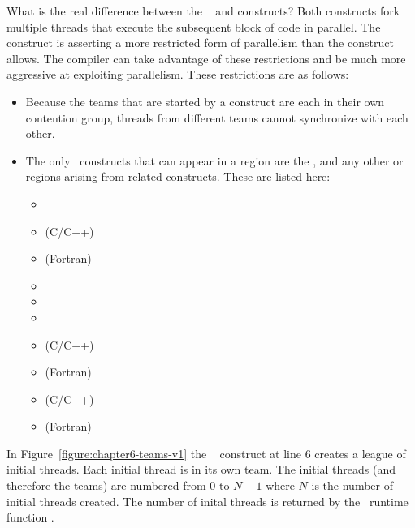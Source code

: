 What is the real difference between the ~ and
 constructs? Both constructs fork multiple threads that execute
the subsequent block of code in parallel.  The  construct is
asserting a more restricted form of parallelism than the 
construct allows.  The compiler can take advantage of these restrictions and be
much more aggressive at exploiting parallelism.  These restrictions are as
follows:

\begin{itemize}

  \item Because the teams that are started by a 
  construct are each in their own contention group, threads from different 
  teams cannot synchronize with each other.

  \item The only \OMP\ constructs that can appear in a  region
  are the ,  and any other  or
   regions arising from related constructs.  These are
  listed here: \begin{itemize}
      \item {} 
      \item {} (C/C++)
      \item {} (Fortran)
      \item {}
      \item {} 
      \item {}
      \item {} (C/C++)
      \item {} (Fortran)
      \item {} (C/C++)
      \item {} (Fortran)
  \end{itemize}

\end{itemize}

In Figure~\ref{figure:chapter6-teams-v1} the ~ construct
at line $6$ creates a league of initial threads.  Each initial thread is in its own team.
The initial threads (and therefore the teams) are numbered from $0$ to $N-1$ where
$N$ is the number of initial threads created.  The number of inital threads
is returned by the \OMP\ runtime function .

